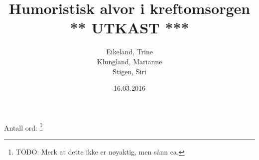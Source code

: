 \documentclass[a4paper,norsk,12pt]{report}
\begin{document}
  \author{Eikeland, Trine\\Klungland, Marianne\\Stigen, Siri}
  \date{16.03.2016}
  \title{Humoristisk alvor i kreftomsorgen \\
    {\Huge{\sffamily *** UTKAST ***}}}

  
  \maketitle
  \begin{abstract}
  
  \end{abstract}

  \tableofcontents

  Antall ord: \footnote{TODO: Merk at dette ikke er
  nøyaktig, men sånn ca.}
  \clearpage

  \renewcommand{\arraystretch}{1.2}

  
  
  
  
  
  
  
  \clearpage

  \begingroup %
  \raggedright %
  \nocite{*} %
  
  \endgroup %

  \appendix
  
  \clearpage %
  \printindex
\end{document}
